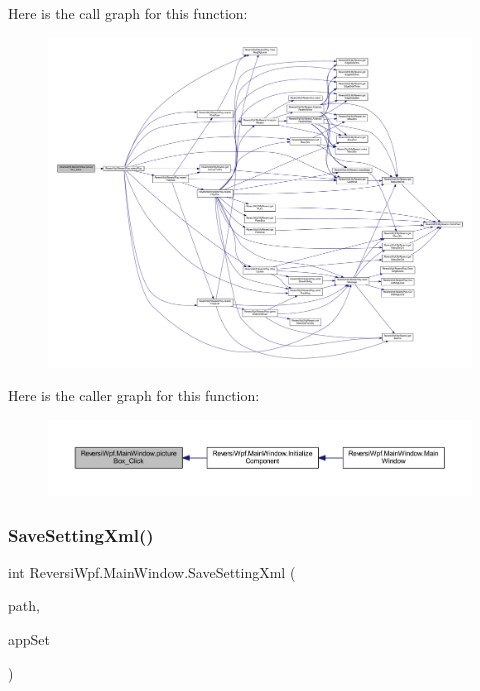 Here is the call graph for this function\+:
\nopagebreak
\begin{figure}[H]
\begin{center}
\leavevmode
\includegraphics[width=350pt]{class_reversi_wpf_1_1_main_window_a7514a29baed5a572e78354addb9678bc_cgraph}
\end{center}
\end{figure}
Here is the caller graph for this function\+:
\nopagebreak
\begin{figure}[H]
\begin{center}
\leavevmode
\includegraphics[width=350pt]{class_reversi_wpf_1_1_main_window_a7514a29baed5a572e78354addb9678bc_icgraph}
\end{center}
\end{figure}
\mbox{\label{class_reversi_wpf_1_1_main_window_a02e0ae28907a572eca49167b37ce7db9}} 
\subsubsection{\texorpdfstring{Save\+Setting\+Xml()}{SaveSettingXml()}}
{\footnotesize\ttfamily int Reversi\+Wpf.\+Main\+Window.\+Save\+Setting\+Xml (\begin{DoxyParamCaption}\item[{string}]{path,  }\item[{ref \hyperlink{class_reversi_wpf_1_1_reversi_setting}{Reversi\+Setting}}]{app\+Set }\end{DoxyParamCaption})}



